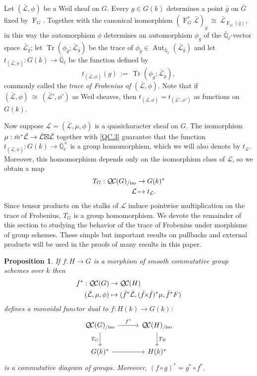 \documentclass{amsart}
\theoremstyle{plain}
\newtheorem{proposition}[theorem]{Proposition}
\theoremstyle{definition}
\theoremstyle{remark}
\newcommand{\EE}{\mathbb{\bar Q}_\ell}
\newcommand{\Fq}{k}
\newcommand{\EEx}{\EE^\times}
\newcommand{\Frob}[1]{\operatorname{F}_{#1}}
\DeclareMathOperator{\Aut}{Aut}
\DeclareMathOperator{\trace}{Tr}
\newcommand{\ceq}{{\, :=\, }}
\newcommand{\iso}{{\ \cong\ }}
\newcommand{\trFrob}[1]{t_{#1}}
\newcommand{\TrFrob}[1]{T_{#1}}
\newcommand{\qcs}[1]{{\mathcal{#1}}}
\newcommand{\gqcs}[1]{{\mathcal{\bar #1}}}
\newcommand{\QC}{{\mathcal{Q\hskip-0.8pt C}}}
\newcommand{\QCiso}[1]{\QC(#1)_{/\text{iso}}}
\renewcommand{\bf}{\bar{f}}
\newcommand{\bg}{\bar{g}}
\newcommand{\bm}{\bar{m}}
\newcommand{\bG}{\bar{G}}
\newcommand{\tight}[3]{\hspace{-#1pt}{#2}\hspace{-#3pt}}
\newcommand{\bfxf}{\text{$\bar{f} \tight{1}{\times}{1} \bar{f}$}}
\newcommand{\LxL}{\text{$\gqcs{L} \tight{0}{\boxtimes}{0} \gqcs{L}$}}
\begin{document}
%


Let $(\gqcs{L},\phi)$ be a Weil sheaf on $G$. Every $g\in G(\Fq)$
determines a point $\bg$ on $\bG$ fixed by $\Frob{G}$. 
Together with the canonical isomorphism $(\Frob{G}^*\gqcs{L})_{\bg} \iso  \gqcs{L}_{\Frob{G}(\bg)}$, in this way the automorphism $\phi$ determines an automorphism $\phi_{\bg}$ of the $\EE$-vector space $\gqcs{L}_{\bg}$; let $\trace(\phi_{\bg};\gqcs{L}_{\bg})$ be the trace of $\phi_{\bg} \in \Aut_{\EE}(\gqcs{L}_{\bg})$ and let $\trFrob{(\gqcs{L},\phi)} : G(\Fq)\to \EE$ be the function defined by 
\begin{equation}\label{trWeil}
\trFrob{(\gqcs{L},\phi)}(g) \ceq \trace(\phi_{\bg};\gqcs{L}_{\bg}),
\end{equation}
commonly called the {\em trace of Frobenius of $(\gqcs{L},\phi)$}.
Note that if $(\gqcs{L},\phi) \iso (\gqcs{L'},\phi')$ as Weil sheaves, 
then $\trFrob{(\gqcs{L},\phi)} = \trFrob{(\gqcs{L'},\phi')}$ as functions on $G(\Fq)$.

Now suppose $\qcs{L} = (\gqcs{L},\mu,\phi)$ is a quasicharacter sheaf on $G$.
The isomorphism $\mu : \bm^* \gqcs{L} \to \LxL$ together with
\ref{QC.3} guarantee
that the function $\trFrob{(\gqcs{L},\phi)} : G(\Fq)\to \EEx$ is a group homomorphism, which we will also denote by $\trFrob{\qcs{L}}$.  Moreover,
this homomorphism depends only on the isomorphism class of $\qcs{L}$, so we obtain a map
\begin{align*}
\TrFrob{G} : \QCiso{G} &\to G(\Fq)^* \\
\qcs{L} &\mapsto \trFrob{\qcs{L}}.
\end{align*}
Since tensor products on the stalks of $\qcs{L}$ induce pointwise multiplication on the trace of Frobenius, $\TrFrob{G}$ is a group homomorphism.  We devote the remainder of this section to
studying the behavior of the trace of Frobenius under morphisms of group schemes.  These simple but important
results on pullbacks and external products will be used in the proofs of many results in this paper.

\begin{proposition}\label{prop:pullback}
  If $f : H\to G$ is a morphism of smooth commutative group schemes over $\Fq$ then
  \begin{align*}
  f^* : \QC(G) &\to \QC(H) \\
  (\gqcs{L},\mu,\phi) &\mapsto (\bf^*\gqcs{L},(\bfxf)^*\mu,\bf^*F)
  \end{align*}
  defines a monoidal functor dual to $f \colon H(\Fq) \to G(\Fq)$:
  \[
  \begin{tikzcd}[row sep=20, column sep=30]
   \QCiso{G} \rar{f^*} \arrow[swap]{d}{\TrFrob{G}} & \QCiso{H} \dar{\TrFrob{H}} \\
   G(\Fq)^* \rar & H(\Fq)^*
  \end{tikzcd}
  \]
  is a commutative diagram of groups.  Moreover, $(f\circ g)^* = g^* \circ f^*$.
\end{proposition}
\end{document}
